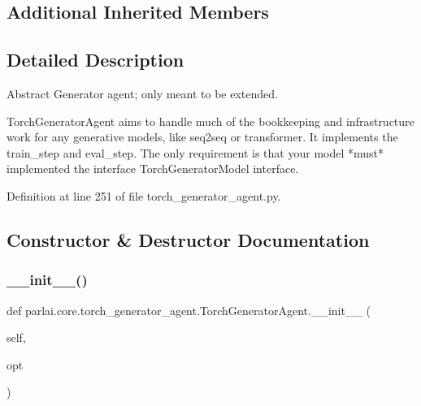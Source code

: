 \subsection*{Additional Inherited Members}


\subsection{Detailed Description}
\begin{DoxyVerb}Abstract Generator agent; only meant to be extended.

TorchGeneratorAgent aims to handle much of the bookkeeping and infrastructure work
for any generative models, like seq2seq or transformer. It implements the train_step
and eval_step. The only requirement is that your model *must* implemented the
interface TorchGeneratorModel interface.
\end{DoxyVerb}
 

Definition at line 251 of file torch\+\_\+generator\+\_\+agent.\+py.



\subsection{Constructor \& Destructor Documentation}
\mbox{\label{classparlai_1_1core_1_1torch__generator__agent_1_1TorchGeneratorAgent_a994ed6de4104aa3135deed2fcba75520}} 
\subsubsection{\texorpdfstring{\+\_\+\+\_\+init\+\_\+\+\_\+()}{\_\_init\_\_()}}
{\footnotesize\ttfamily def parlai.\+core.\+torch\+\_\+generator\+\_\+agent.\+Torch\+Generator\+Agent.\+\_\+\+\_\+init\+\_\+\+\_\+ (\begin{DoxyParamCaption}\item[{}]{self,  }\item[{}]{opt }\end{DoxyParamCaption})}



